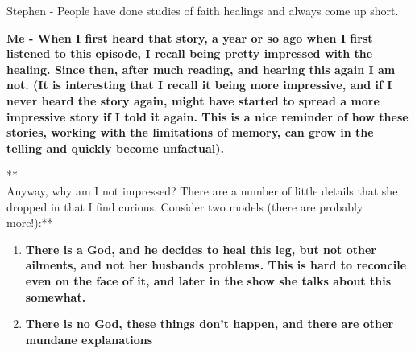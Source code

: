 Stephen - People have done studies of faith healings and always come up
short.

\textbf{Me - When I first heard that story, a year or so ago when I
first listened to this episode, I recall being pretty impressed with the
healing. Since then, after much reading, and hearing this again I am
not. (It is interesting that I recall it being more impressive, and if I
never heard the story again, might have started to spread a more
impressive story if I told it again. This is a nice reminder of how
these stories, working with the limitations of memory, can grow in the
telling and quickly become unfactual).\\}

**\\Anyway, why am I not impressed? There are a number of little details
that she dropped in that I find curious. Consider two models (there are
probably more!):**

\begin{enumerate}
\def\labelenumi{\arabic{enumi}.}
\itemsep1pt\parskip0pt
\item
  \textbf{There is a God, and he decides to heal this leg, but not other
  ailments, and not her husbands problems. This is hard to reconcile
  even on the face of it, and later in the show she talks about this
  somewhat.}
\item
  \textbf{There is no God, these things don't happen, and there are
  other mundane explanations}
\end{enumerate}

